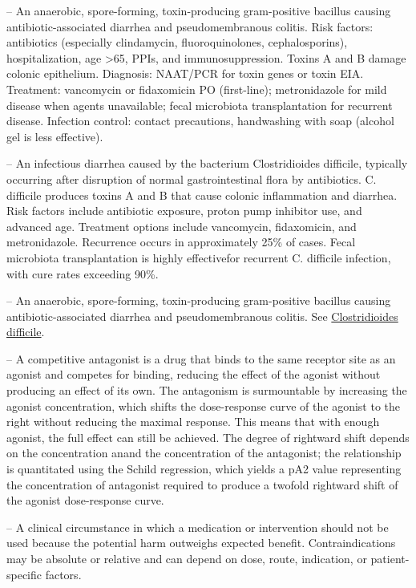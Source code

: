 -- An anaerobic, spore-forming, toxin-producing gram-positive bacillus causing antibiotic-associated diarrhea and pseudomembranous colitis. Risk factors: antibiotics (especially clindamycin, fluoroquinolones, cephalosporins), hospitalization, age >65, PPIs, and immunosuppression. Toxins A and B damage colonic epithelium. Diagnosis: NAAT/PCR for toxin genes or toxin EIA. Treatment: vancomycin or fidaxomicin PO (first-line); metronidazole for mild disease when agents unavailable; fecal microbiota transplantation for recurrent disease. Infection control: contact precautions, handwashing with soap (alcohol gel is less effective).

-- An infectious diarrhea caused by the bacterium Clostridioides difficile, typically occurring after disruption of normal gastrointestinal flora by antibiotics. C. difficile produces toxins A and B that cause colonic inflammation and diarrhea. Risk factors include antibiotic exposure, proton pump inhibitor use, and advanced age. Treatment options include vancomycin, fidaxomicin, and metronidazole. Recurrence occurs in approximately 25\% of cases. Fecal microbiota transplantation is highly effectivefor recurrent C. difficile infection, with cure rates exceeding 90\%.

-- An anaerobic, spore-forming, toxin-producing gram-positive bacillus causing antibiotic-associated diarrhea and pseudomembranous colitis. See \hyperlink{Clostridioides difficile}{Clostridioides difficile}.

-- A competitive antagonist is a drug that binds to the same receptor site as an agonist and competes for binding, reducing the effect of the agonist without producing an effect of its own. The antagonism is surmountable by increasing the agonist concentration, which shifts the dose-response curve of the agonist to the right without reducing the maximal response. This means that with enough agonist, the full effect can still be achieved. The degree of rightward shift depends on the concentration anand the concentration of the antagonist; the relationship is quantitated using the Schild regression, which yields a pA2 value representing the concentration of antagonist required to produce a twofold rightward shift of the agonist dose-response curve.

-- A clinical circumstance in which a medication or intervention should not be used because the potential harm outweighs expected benefit. Contraindications may be absolute or relative and can depend on dose, route, indication, or patient-specific factors.

